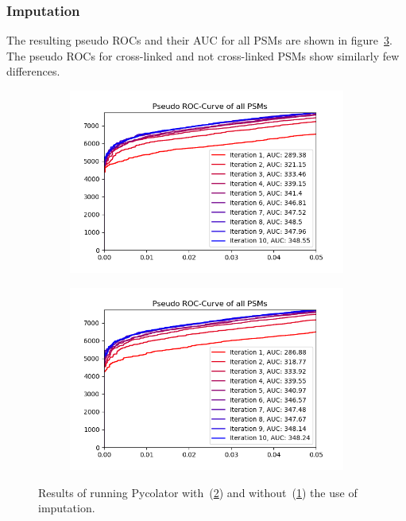 \subsubsection{Imputation}
\label{lab:results:imputation}
The resulting pseudo ROCs and their AUC for all PSMs are shown in figure~\ref{fig:results:imputation}. The pseudo ROCs for cross-linked and not cross-linked PSMs show similarly few differences.
\renewcommand{\baselinestretch}{0.9}
\begin{figure}
	\normalsize
	\centering
	\begin{subfigure}{0.49 \textwidth}
		\includegraphics[width = \textwidth]{figures/no_imputation.png}
		\caption{}
		\label{fig:results:imputation_no}
	\end{subfigure}
	\hfill
	\begin{subfigure}{0.49 \textwidth}
		\includegraphics[width = \textwidth]{figures/imputation.png}
		\caption{}
		\label{fig:results:imputation_yes}
	\end{subfigure}
	\caption[Results of imputation]{Results of running Pycolator with~(\ref{fig:results:imputation_yes}) and without~(\ref{fig:results:imputation_no}) the use of imputation.}
	\label{fig:results:imputation}
\end{figure}
\renewcommand{\baselinestretch}{1}

